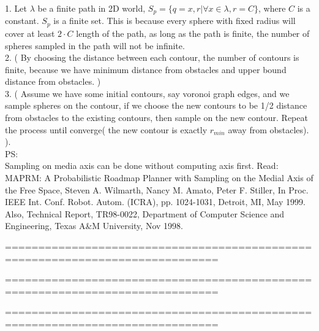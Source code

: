 \documentclass[12pt]{article}
\begin{document}
  1. Let $\lambda$ be a finite path in 2D world, $S_p = \{ q = {x,r} | \forall x \in \lambda, r = C \}$, where $C$ is a constant. $S_p$ is a finite set. This is because every sphere with fixed radius will cover at least $2 \cdot C$ length of the path, as long as the path is finite, the number of spheres sampled in the path will not be infinite.\\
  
  2. ( By choosing the distance between each contour, the number of contours is finite, because we have minimum distance from obstacles and upper bound distance from obstacles. )\\
  
  3. ( Assume we have some initial contours, say voronoi graph edges, and we sample spheres on the contour, if we choose the new contours to be 1/2 distance from obstacles to the existing contours, then sample on the new contour. Repeat the process until converge( the new contour is exactly $r_{min}$ away from obstacles). ).\\
  
  PS:\\
  
  Sampling on media axis can be done without computing axis first. Read: MAPRM: A Probabilistic Roadmap Planner with Sampling on the Medial Axis of the Free Space, Steven A. Wilmarth, Nancy M. Amato, Peter F. Stiller, In Proc. IEEE Int. Conf. Robot. Autom. (ICRA), pp. 1024-1031, Detroit, MI, May 1999. Also, Technical Report, TR98-0022, Department of Computer Science and Engineering, Texas A&M University, Nov 1998. 
  
==============================================================================

==============================================================================  

==============================================================================\\  
  
  
  
  
  
\end{document}
